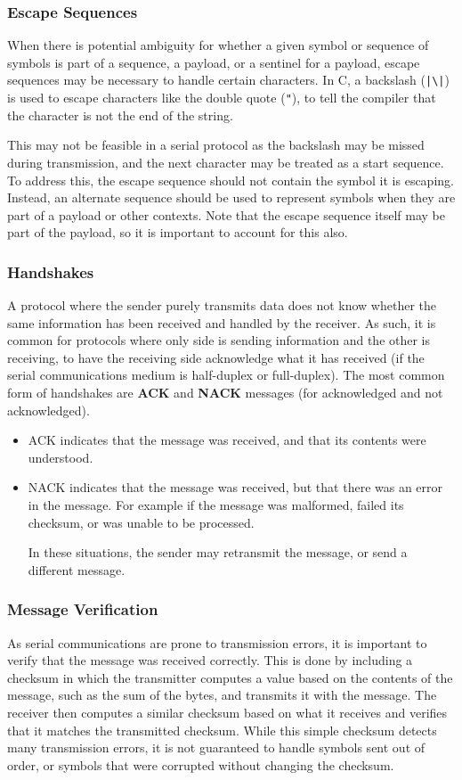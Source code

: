 \documentclass{article}
\begin{document}
\subsubsection{Escape Sequences}
When there is potential ambiguity for whether a given symbol or
sequence of symbols is part of a sequence, a payload, or a sentinel for
a payload, escape sequences may be necessary to handle certain
characters. In C, a backslash
(\texttt{|\backslash|}) is used to escape
characters like the double quote (\texttt{"}), to tell the
compiler that the character is not the end of the string.

This may not be feasible in a serial protocol as the backslash may be
missed during transmission, and the next character may be treated as a
start sequence. To address this, the escape sequence should not contain
the symbol it is escaping. Instead, an alternate sequence should be
used to represent symbols when they are part of a payload or other
contexts. Note that the escape sequence itself may be part of the
payload, so it is important to account for this also.
\subsubsection{Handshakes}
A protocol where the sender purely transmits data does not know whether
the same information has been received and handled by the receiver. As
such, it is common for protocols where only side is sending information
and the other is receiving, to have the receiving side acknowledge what
it has received (if the serial communications medium is half-duplex or
full-duplex). The most common form of handshakes are \textbf{ACK} and
\textbf{NACK} messages (for acknowledged and not acknowledged).
\begin{itemize}
    \item ACK indicates that the message was received, and that its
          contents were understood.
    \item NACK indicates that the message was received, but that there
          was an error in the message. For example if the message was
          malformed, failed its checksum, or was unable to be
          processed.

          In these situations, the sender may retransmit the message,
          or send a different message.
\end{itemize}
\subsubsection{Message Verification}
As serial communications are prone to transmission errors, it is
important to verify that the message was received correctly. This is
done by including a checksum in which the transmitter computes a value
based on the contents of the message, such as the sum of the bytes, and
transmits it with the message. The receiver then computes a similar
checksum based on what it receives and verifies that it matches the
transmitted checksum. While this simple checksum detects many
transmission errors, it is not guaranteed to handle symbols sent out of
order, or symbols that were corrupted without changing the checksum.
\end{document}
